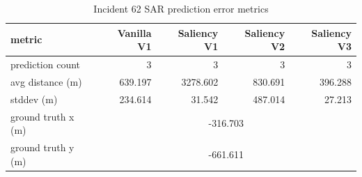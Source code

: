 \begin{table}[ht]
\centering
\caption{Incident 62 SAR prediction error metrics}
\label{tab:sar-incident-62}
\begin{tabular}{lrrrr}
\hline
metric & Vanilla V1 & Saliency V1 & Saliency V2 & Saliency V3 \\
\hline
prediction count & 3 & 3 & 3 & 3 \\
avg distance (m) & 639.197 & 3278.602 & 830.691 & 396.288 \\
stddev (m) & 234.614 & 31.542 & 487.014 & 27.213 \\
ground truth x (m) & \multicolumn{4}{c}{-316.703} \\
ground truth y (m) & \multicolumn{4}{c}{-661.611} \\
\hline
\end{tabular}
\end{table}
